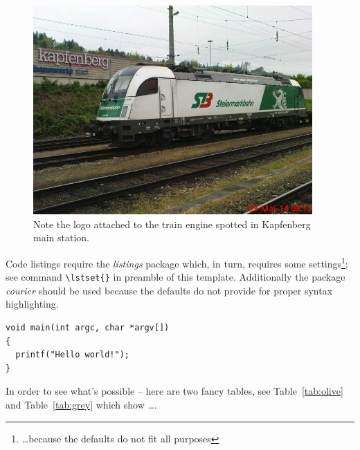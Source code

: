 \begin{figure}[h]
  \centering
  \includegraphics[keepaspectratio,width=0.95\textwidth]{images/engine}
  \caption[Logo at the train engine.]{Note the logo attached to the train engine spotted in Kapfenberg main station.}
  \label{fig:engine}
\end{figure}

Code listings require the \textit{listings} package which, in turn, requires some settings\footnote{\ldots because the defaults do not fit all purposes}; see command \verb+\lstset{}+ in preamble of this template. Additionally the package \textit{courier} should be used because the defaults do not provide for proper syntax highlighting.

\begin{lstlisting}
void main(int argc, char *argv[])
{
  printf("Hello world!");
}
\end{lstlisting}

In order to see what's possible -- here are two fancy tables, see Table~\ref{tab:olive} and Table~\ref{tab:grey} which show \ldots.

